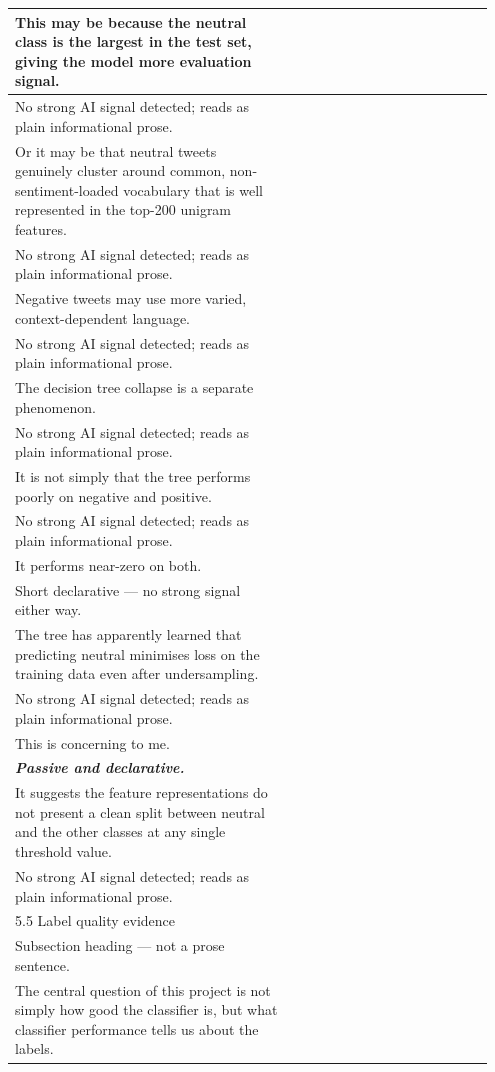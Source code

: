 \documentclass[11pt]{article}
\begin{document}
\begin{longtable}{|p{0.55\linewidth}|p{0.40\linewidth}|}
\hline
This may be because the neutral class is the largest in the test set, giving the model more evaluation signal. & \\[2pt]
\hline
No strong AI signal detected; reads as plain informational prose. & \\
\hline
Or it may be that neutral tweets genuinely cluster around common, non-sentiment-loaded vocabulary that is well represented in the top-200 unigram features. & \\[2pt]
\hline
No strong AI signal detected; reads as plain informational prose. & \\
\hline
Negative tweets may use more varied, context-dependent language. & \\[2pt]
\hline
No strong AI signal detected; reads as plain informational prose. & \\
\hline
The decision tree collapse is a separate phenomenon. & \\[2pt]
\hline
No strong AI signal detected; reads as plain informational prose. & \\
\hline
It is not simply that the tree performs poorly on negative and positive. & \\[2pt]
\hline
No strong AI signal detected; reads as plain informational prose. & \\
\hline
It performs near-zero on both. & \\[2pt]
\hline
Short declarative --- no strong signal either way. & \\
\hline
The tree has apparently learned that predicting neutral minimises loss on the training data even after undersampling. & \\[2pt]
\hline
No strong AI signal detected; reads as plain informational prose. & \\
\hline
This is concerning to me. & \\[2pt]
\hline
\textbf{\textit{Passive and declarative.}}\vspace{2em} & \\
\hline
It suggests the feature representations do not present a clean split between neutral and the other classes at any single threshold value. & \\[2pt]
\hline
No strong AI signal detected; reads as plain informational prose. & \\
\hline
5.5 Label quality evidence & \\[2pt]
\hline
Subsection heading --- not a prose sentence. & \\
\hline
The central question of this project is not simply how good the classifier is, but what classifier performance tells us about the labels. & \\[2pt]

\end{longtable}
\end{document}
